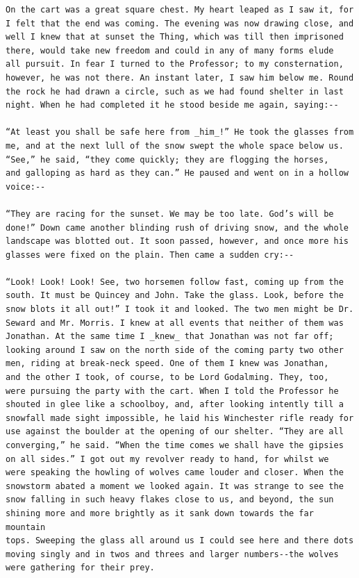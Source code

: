 \documentclass{article}
\begin{document}
\begin{verbatim}
On the cart was a great square chest. My heart leaped as I saw it, for
I felt that the end was coming. The evening was now drawing close, and
well I knew that at sunset the Thing, which was till then imprisoned
there, would take new freedom and could in any of many forms elude
all pursuit. In fear I turned to the Professor; to my consternation,
however, he was not there. An instant later, I saw him below me. Round
the rock he had drawn a circle, such as we had found shelter in last
night. When he had completed it he stood beside me again, saying:--

“At least you shall be safe here from _him_!” He took the glasses from
me, and at the next lull of the snow swept the whole space below us.
“See,” he said, “they come quickly; they are flogging the horses,
and galloping as hard as they can.” He paused and went on in a hollow
voice:--

“They are racing for the sunset. We may be too late. God’s will be
done!” Down came another blinding rush of driving snow, and the whole
landscape was blotted out. It soon passed, however, and once more his
glasses were fixed on the plain. Then came a sudden cry:--

“Look! Look! Look! See, two horsemen follow fast, coming up from the
south. It must be Quincey and John. Take the glass. Look, before the
snow blots it all out!” I took it and looked. The two men might be Dr.
Seward and Mr. Morris. I knew at all events that neither of them was
Jonathan. At the same time I _knew_ that Jonathan was not far off;
looking around I saw on the north side of the coming party two other
men, riding at break-neck speed. One of them I knew was Jonathan,
and the other I took, of course, to be Lord Godalming. They, too,
were pursuing the party with the cart. When I told the Professor he
shouted in glee like a schoolboy, and, after looking intently till a
snowfall made sight impossible, he laid his Winchester rifle ready for
use against the boulder at the opening of our shelter. “They are all
converging,” he said. “When the time comes we shall have the gipsies
on all sides.” I got out my revolver ready to hand, for whilst we
were speaking the howling of wolves came louder and closer. When the
snowstorm abated a moment we looked again. It was strange to see the
snow falling in such heavy flakes close to us, and beyond, the sun
shining more and more brightly as it sank down towards the far mountain
tops. Sweeping the glass all around us I could see here and there dots
moving singly and in twos and threes and larger numbers--the wolves
were gathering for their prey.


\end{verbatim}
\end{document}
